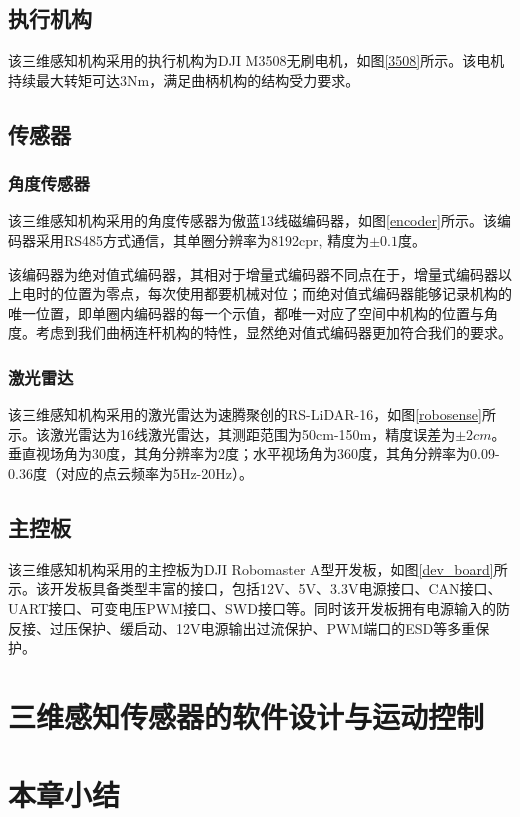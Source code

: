 \subsection{执行机构}
该三维感知机构采用的执行机构为DJI M3508无刷电机，如图\ref{3508}所示。该电机持续最大转矩可达3Nm，满足曲柄机构的结构受力要求。

\subsection{传感器}

\subsubsection{角度传感器}
该三维感知机构采用的角度传感器为傲蓝13线磁编码器，如图\ref{encoder}所示。该编码器采用RS485方式通信，其单圈分辨率为8192cpr, 精度为$\pm 0.1$度。

该编码器为绝对值式编码器，其相对于增量式编码器不同点在于，增量式编码器以上电时的位置为零点，每次使用都要机械对位；而绝对值式编码器能够记录机构的唯一位置，即单圈内编码器的每一个示值，都唯一对应了空间中机构的位置与角度。考虑到我们曲柄连杆机构的特性，显然绝对值式编码器更加符合我们的要求。

\subsubsection{激光雷达}
该三维感知机构采用的激光雷达为速腾聚创的RS-LiDAR-16，如图\ref{robosense}所示。该激光雷达为16线激光雷达，其测距范围为50cm-150m，精度误差为$\pm 2cm$。垂直视场角为30度，其角分辨率为2度；水平视场角为360度，其角分辨率为0.09-0.36度（对应的点云频率为5Hz-20Hz）。

\subsection{主控板}
该三维感知机构采用的主控板为DJI Robomaster A型开发板，如图\ref{dev_board}所示。该开发板具备类型丰富的接口，包括12V、5V、3.3V电源接口、CAN接口、UART接口、可变电压PWM接口、SWD接口等。同时该开发板拥有电源输入的防反接、过压保护、缓启动、12V电源输出过流保护、PWM端口的ESD等多重保护。

\section{三维感知传感器的软件设计与运动控制}

\section{本章小结}